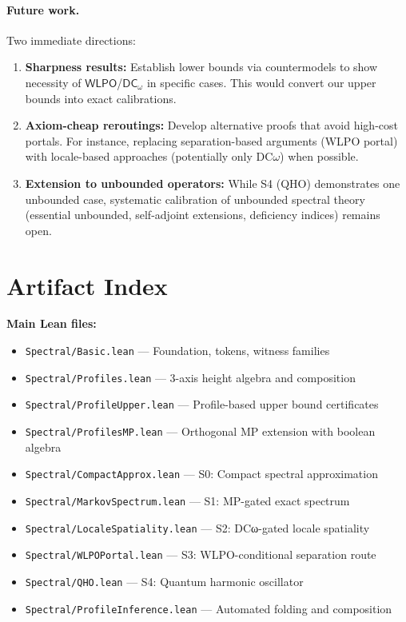 \documentclass[11pt]{article}
\newcommand{\WLPO}{\mathsf{WLPO}}
\newcommand{\DCw}{\mathsf{DC}_{\omega}}
\newcommand{\lean}[1]{\texttt{#1}}
\theoremstyle{plain}
\theoremstyle{definition}
\theoremstyle{remark}
\begin{document}
\paragraph{Future work.}
Two immediate directions: 
\begin{enumerate}
\item \textbf{Sharpness results:} Establish lower bounds via countermodels to show necessity of $\WLPO$/$\DCw$ in specific cases. This would convert our upper bounds into exact calibrations.

\item \textbf{Axiom-cheap reroutings:} Develop alternative proofs that avoid high-cost portals. For instance, replacing separation-based arguments (WLPO portal) with locale-based approaches (potentially only DC$\omega$) when possible.

\item \textbf{Extension to unbounded operators:} While S4 (QHO) demonstrates one unbounded case, systematic calibration of unbounded spectral theory (essential unbounded, self-adjoint extensions, deficiency indices) remains open.
\end{enumerate}

\appendix
\section{Artifact Index}

\textbf{Main Lean files:}
\begin{itemize}[noitemsep]
\item \lean{Spectral/Basic.lean} — Foundation, tokens, witness families
\item \lean{Spectral/Profiles.lean} — 3-axis height algebra and composition  
\item \lean{Spectral/ProfileUpper.lean} — Profile-based upper bound certificates
\item \lean{Spectral/ProfilesMP.lean} — Orthogonal MP extension with boolean algebra
\item \lean{Spectral/CompactApprox.lean} — S0: Compact spectral approximation
\item \lean{Spectral/MarkovSpectrum.lean} — S1: MP-gated exact spectrum
\item \lean{Spectral/LocaleSpatiality.lean} — S2: DCω-gated locale spatiality  
\item \lean{Spectral/WLPOPortal.lean} — S3: WLPO-conditional separation route
\item \lean{Spectral/QHO.lean} — S4: Quantum harmonic oscillator
\item \lean{Spectral/ProfileInference.lean} — Automated folding and composition
\end{itemize}
\end{document}
